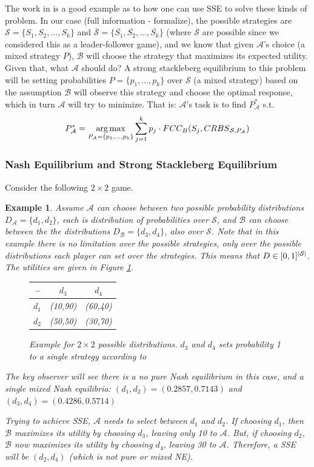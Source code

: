\documentclass[a4paper,10pt]{article}
\newtheorem{Example}{Example}[section]
\newcommand{\fcc}{\ensuremath{FCC}\xspace}
\newcommand{\A}{\ensuremath{\mathcal{A}}\xspace}
\newcommand{\B}{\ensuremath{\mathcal{B}}\xspace}
\DeclarePairedDelimiter\abs{\lvert}{\rvert}%
\DeclareMathOperator*{\argmax}{arg\,max} %
\begin{document}
The work in  \cite{korzhyk2011stackelberg} is a good example as to how one can use SSE to solve these kinds of problem. In our case (full information - formalize), the possible strategies are $\mathcal{S}=\{S_1,S_2,...,S_k\}$ and $\mathcal{\overline{S}}=\{\overline{S_1},\overline{S_2},...,\overline{S_k}\}$ (where $\mathcal{\overline{S}}$ are possible since we considered this as a leader-follower game), and we know that given \A's choice (a mixed strategy $P$), \B will choose the strategy that maximizes its expected utility. Given that, what \A should do?
A strong stackleberg equilibrium to this problem will be setting probabilities $P=\{p_1,...,p_k\}$ over $\mathcal{S}$ (a mixed strategy) based on the assumption \B will observe this strategy and choose the optimal response, which in turn \A will try to minimize. That is: \A's task is to find $P_{\A}^*$ s.t.
\begin{equation} \label{equations: optimal Pa}
  P_{\A}^*=\argmax_{P_{\A}=\{p_1,...,p_k\}}\sum_{j=1}^{k}{p_j\cdot \fcc_B(S_j,\crbs[\mathcal{S}][P_{\A}])}  
\end{equation}


\subsubsection{Nash Equilibrium and Strong Stackleberg Equilibrium}
Consider the following $2\times 2$ game.
\begin{Example}
Assume \A can choose between two possible probability distributions $D_{\A}=\{d_1,d_2\}$, each is distribution of probabilities over $\mathcal{S}$, and \B can choose between the the distributions $D_{\B}= \{d_3,d_4\}$, also over $\mathcal{S}$. Note that in this example there is no limitation over the possible strategies, only over the possible distributions each player can set over the strategies. This means that $D\in[0,1]^{\abs*{\mathcal{S}}}$.
The utilities are given in Figure \ref{tables: example SSE 2X2}.
\begin{figure} 
\centering
\begin{tabular}{|c|c|c|} 
  -- & $d_3$ & $d_4$\\
  \hline $d_1$ & (10,90) & (60,40)\\
  \hline $d_2$ & (50,50) & (30,70)\\
\end{tabular}
\caption{Example for $2 \times 2$ possible distributions. $d_3$ and $d_4$ sets probability 1 to a single strategy according to \crbs[\mathcal{S}][d_{1/2}]} \label{tables: example SSE 2X2}
\end{figure}


The key observer will see there is a no pure Nash equilibrium in this case, and a single mixed Nash equilibria: $(d_1, d_2) = (0.2857,0.7143)$ and $(d_3, d_4) = (0.4286,0.5714)$

Trying to achieve SSE, \A needs to select between $d_1$ and $d_2$. If choosing $d_1$, then \B maximizes its utility by choosing $d_3$, leaving only 10 to \A. But, if choosing $d_2$, \B now maximizes its utility by choosing $d_4$, leaving 30 to \A. Therefore, a SSE will be $(d_2,d_4)$ (which is not pure or mixed NE).

\end{Example}
\end{document}
